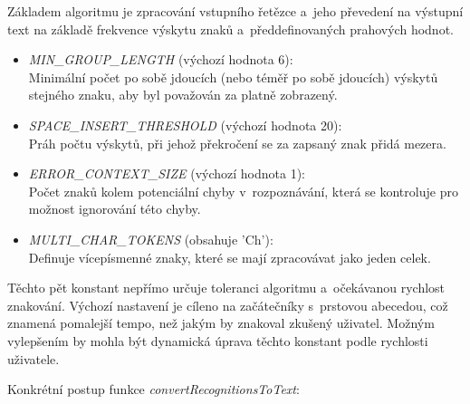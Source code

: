 \documentclass[
  master,
  program=ainfvs,
  biblatex,
  figures=true,
  tables=false,
  sourcecodes=true,
  glossaries,
  index
]{kidiplom}
\begin{document}
        Základem algoritmu je zpracování vstupního řetězce a~jeho převedení na výstupní text na základě frekvence výskytu znaků a~předdefinovaných prahových hodnot.
        
        \begin{itemize}
            \item \emph{MIN\_GROUP\_LENGTH} (výchozí hodnota 6): \\ Minimální počet po sobě jdoucích (nebo téměř po sobě jdoucích) výskytů stejného znaku, aby byl považován za platně zobrazený.
            \item \emph{SPACE\_INSERT\_THRESHOLD} (výchozí hodnota 20): \\ Práh počtu výskytů, při jehož překročení se za zapsaný znak přidá mezera.
            \item \emph{ERROR\_CONTEXT\_SIZE} (výchozí hodnota 1): \\ Počet znaků kolem potenciální chyby v~rozpoznávání, která se kontroluje pro možnost ignorování této chyby.
            \item \emph{MULTI\_CHAR\_TOKENS} (obsahuje 'Ch'): \\ Definuje vícepísmenné znaky, které se mají zpracovávat jako jeden celek.
        \end{itemize}
        
        Těchto pět konstant nepřímo určuje toleranci algoritmu a~očekávanou rychlost znakování. Výchozí nastavení je cíleno na začátečníky s~prstovou abecedou, což znamená pomalejší tempo, než jakým by znakoval zkušený uživatel. Možným vylepšením by mohla být dynamická úprava těchto konstant podle rychlosti uživatele.

        Konkrétní postup funkce \emph{convertRecognitionsToText}:
\end{document}
